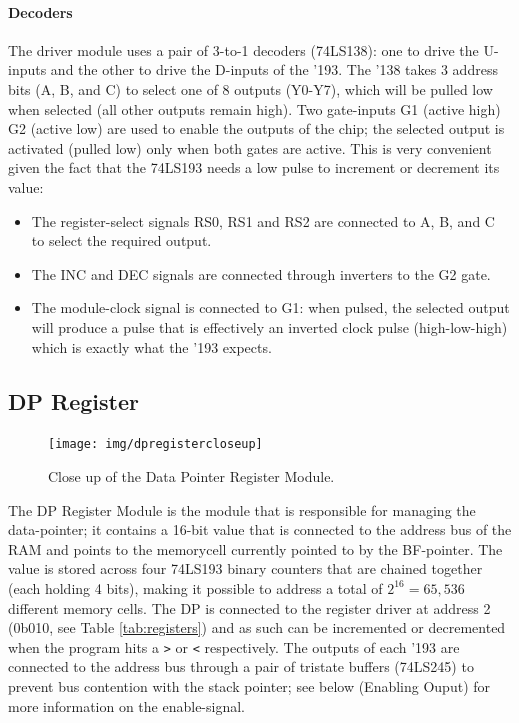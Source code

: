 \paragraph{Decoders} The driver module uses a pair of 3-to-1 decoders (74LS138): one to drive the U-inputs and the other to drive the D-inputs of the '193. The '138 takes 3 address bits (A, B, and C) to select one of 8 outputs (Y0-Y7), which will be pulled low when selected (all other outputs remain high). Two gate-inputs G1 (active high) G2 (active low) are used to enable the outputs of the chip; the selected output is activated (pulled low) only when both gates are active. This is very convenient given the fact that the 74LS193 needs a low pulse to increment or decrement its value:
\begin{itemize}
\item The register-select signals RS0, RS1 and RS2 are connected to A, B, and C to select the required output.
\item The INC and DEC signals are connected through inverters to the G2 gate.
\item The module-clock signal is connected to G1: when pulsed, the selected output will produce a pulse that is effectively an inverted clock pulse (high-low-high) which is exactly what the '193 expects. 
\end{itemize}


\newpage\subsection{DP Register} \label{sec:implementation:dp}
\begin{figure}[H]
  \centering
  \texttt{[image: img/dpregistercloseup]}
  \caption{Close up of the Data Pointer Register Module.}
  \label{fig:dpregcloseup}
\end{figure}

The DP Register Module is the module that is responsible for managing the data-pointer; it contains a 16-bit value that is connected to the address bus of the RAM and points to the memorycell currently pointed to by the BF-pointer. The value is stored across four 74LS193 binary counters that are chained together (each holding 4 bits), making it possible to address a total of $2^{16}=65,536$ different memory cells. The DP is connected to the register driver at address 2 (0b010, see Table \ref{tab:registers}) and as such can be incremented or decremented when the program hits a \texttt{>} or \texttt{<} respectively. The outputs of each '193 are connected to the address bus through a pair of tristate buffers (74LS245) to prevent bus contention with the stack pointer; see below (Enabling Ouput) for more information on the enable-signal.

